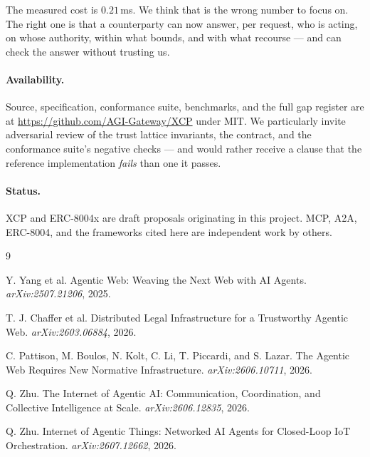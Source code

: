 \documentclass[11pt]{article}
\begin{document}
The measured cost is $0.21$\,ms. We think that is the wrong number to focus on.
The right one is that a counterparty can now answer, per request, who is acting,
on whose authority, within what bounds, and with what recourse --- and can check
the answer without trusting us.

\paragraph{Availability.}
Source, specification, conformance suite, benchmarks, and the full gap register
are at \url{https://github.com/AGI-Gateway/XCP} under MIT. We particularly invite
adversarial review of the trust lattice invariants, the contract, and the
conformance suite's negative checks --- and would rather receive a clause that
the reference implementation \emph{fails} than one it passes.

\paragraph{Status.}
XCP and ERC-8004x are draft proposals originating in this project. MCP, A2A,
ERC-8004, and the frameworks cited here are independent work by others.

\begin{thebibliography}{9}

Y. Yang et al.
\newblock Agentic Web: Weaving the Next Web with AI Agents.
\newblock \emph{arXiv:2507.21206}, 2025.

T. J. Chaffer et al.
\newblock Distributed Legal Infrastructure for a Trustworthy Agentic Web.
\newblock \emph{arXiv:2603.06884}, 2026.

C. Pattison, M. Boulos, N. Kolt, C. Li, T. Piccardi, and S. Lazar.
\newblock The Agentic Web Requires New Normative Infrastructure.
\newblock \emph{arXiv:2606.10711}, 2026.

Q. Zhu.
\newblock The Internet of Agentic AI: Communication, Coordination, and
Collective Intelligence at Scale.
\newblock \emph{arXiv:2606.12835}, 2026.

Q. Zhu.
\newblock Internet of Agentic Things: Networked AI Agents for Closed-Loop IoT
Orchestration.
\newblock \emph{arXiv:2607.12662}, 2026.

\end{thebibliography}
\end{document}
